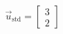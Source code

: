 \documentclass[preview]{standalone}
\begin{document}
\begin{align*}
\vec{u}_{\text{std}} = \begin{bmatrix} 3 \\ 2 \end{bmatrix}
\end{align*}
\end{document}

